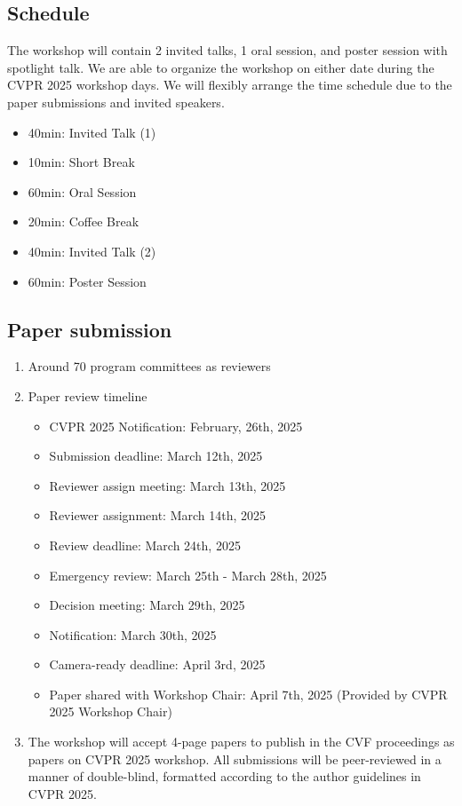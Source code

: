 \documentclass{article}
\begin{document}
\subsection{Schedule}
The workshop will contain 2 invited talks, 1 oral session, and poster session with spotlight talk. We are able to organize the workshop on either date during the CVPR 2025 workshop days. We will flexibly arrange the time schedule due to the paper submissions and invited speakers.
\begin{itemize}
    \item 40min: Invited Talk (1)
    \item 10min: Short Break
    \item 60min: Oral Session
    \item 20min: Coffee Break
    \item 40min: Invited Talk (2)
    \item 60min: Poster Session
\end{itemize}

\subsection{Paper submission}
\begin{enumerate}[label=(\alph*)]
    \item Around 70 program committees as reviewers
    \item Paper review timeline
    \begin{itemize}
        \item CVPR 2025 Notification: February, 26th, 2025
        \item Submission deadline: March 12th, 2025
        \item Reviewer assign meeting: March 13th, 2025
        \item Reviewer assignment: March 14th, 2025
        \item Review deadline: March 24th, 2025
        \item Emergency review: March 25th - March 28th, 2025
        \item Decision meeting: March 29th, 2025
        \item Notification: March 30th, 2025
        \item Camera-ready deadline: April 3rd, 2025
        \item Paper shared with Workshop Chair: April 7th, 2025 (Provided by CVPR 2025 Workshop Chair)
    \end{itemize}
    \item The workshop will accept 4-page papers to publish in the CVF proceedings as papers on CVPR 2025 workshop. All submissions will be peer-reviewed in a manner of double-blind, formatted according to the author guidelines in CVPR 2025.
\end{enumerate}
\end{document}
